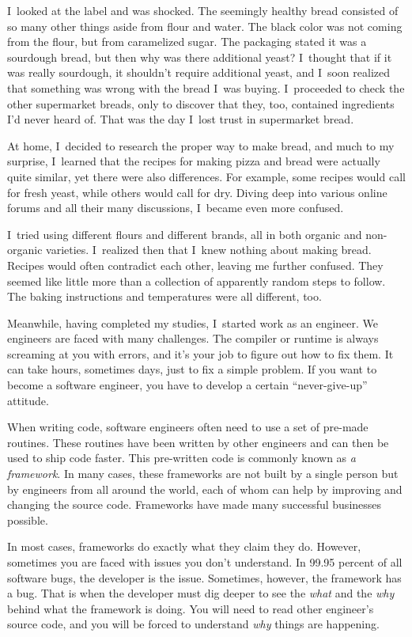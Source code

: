 I~looked at the label and was shocked. The seemingly
healthy bread consisted of so many other things aside from flour and water.
The black color was not coming from the flour, but from caramelized sugar.
The packaging stated it was a sourdough bread, but then why was there additional yeast?
I~thought that if it was really sourdough, it shouldn't require additional yeast, and I~soon 
realized that something was wrong with the bread I~was buying.
I~proceeded to check the other supermarket breads, only to discover that they, too,
contained ingredients I'd never heard of. That was the day I~lost trust
in supermarket bread.

At home, I~decided to research the proper way to make bread, and much to my surprise,
I~learned that the recipes for making pizza and bread were actually quite similar, yet
there were also differences. For example, some recipes would call for fresh yeast, while
others would call for dry. Diving deep into various online forums and all their many
discussions, I~became even more confused.

I~tried using different flours and different brands, all in both organic and non-organic varieties.
I~realized then that I~knew nothing about making bread. Recipes would often contradict each other,
leaving me further confused. They seemed like little more than a collection of apparently random
steps to follow. The baking instructions and temperatures were all different, too.

Meanwhile, having completed my studies, I~started work as an engineer.
We engineers are faced with many challenges. The compiler or runtime is
always screaming at you with errors, and it's your job to figure out how to fix them.
It can take hours, sometimes days, just to fix a simple problem. If you want
to become a software engineer, you have to develop a certain ``never-give-up'' attitude.

When writing code, software engineers often need to use a set of pre-made routines. These routines have been
written by other engineers and can then be used to ship code faster.
This pre-written code is commonly known as \emph{a framework}. In many cases,
these frameworks are not built by a single person but by engineers from all around the world,
each of whom can help by improving and changing the source code. Frameworks have made many successful
businesses possible.

In most cases, frameworks do exactly what they claim they do. However,
sometimes you are faced with issues you don't understand. In 99.95 percent
of all software bugs, the developer is the issue. Sometimes, however, the framework has a
bug. That is when the developer must dig deeper to see the \emph{what} and the
\emph{why} behind what
the framework is doing. You will need to read other engineer's source code, and you will be forced
to understand \emph{why} things are happening.

